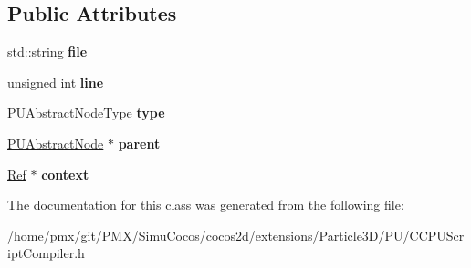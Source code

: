 \subsection*{Public Attributes}
\begin{DoxyCompactItemize}
\item 
\mbox{\label{classPUAbstractNode_a247c048b1cf92df19ed51f4775db86e4}} 
std\+::string {\bfseries file}
\item 
\mbox{\label{classPUAbstractNode_aa903b4726d7cc6163e14229180ae68d9}} 
unsigned int {\bfseries line}
\item 
\mbox{\label{classPUAbstractNode_aba2fb327a8afef769a91da63e8382ab8}} 
P\+U\+Abstract\+Node\+Type {\bfseries type}
\item 
\mbox{\label{classPUAbstractNode_ab0bd4db460f10555e4f77835ab2f2b71}} 
\hyperlink{classPUAbstractNode}{P\+U\+Abstract\+Node} $\ast$ {\bfseries parent}
\item 
\mbox{\label{classPUAbstractNode_aed24318f1bec3c56f8c753e325615398}} 
\hyperlink{classRef}{Ref} $\ast$ {\bfseries context}
\end{DoxyCompactItemize}


The documentation for this class was generated from the following file\+:\begin{DoxyCompactItemize}
\item 
/home/pmx/git/\+P\+M\+X/\+Simu\+Cocos/cocos2d/extensions/\+Particle3\+D/\+P\+U/C\+C\+P\+U\+Script\+Compiler.\+h\end{DoxyCompactItemize}
